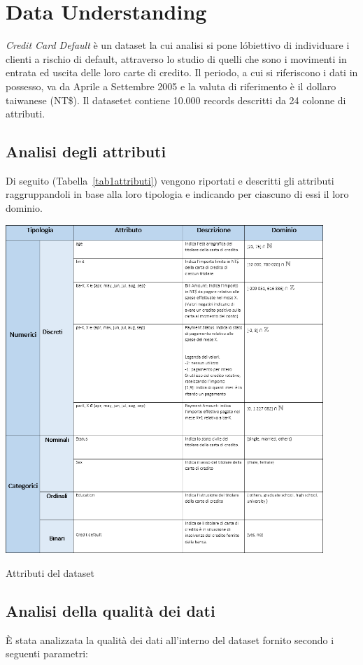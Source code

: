 \chapter{Data Understanding}

\textit{Credit Card Default} \`e un dataset la cui analisi si pone l\' obiettivo
di individuare i clienti a rischio di default, attraverso lo studio di quelli che sono i
movimenti in entrata ed uscita delle loro carte di credito.
Il periodo, a cui si riferiscono i dati in possesso, va da Aprile
a Settembre 2005 e la valuta di riferimento \`e il dollaro
taiwanese (NT\$). Il datasetet contiene 10.000 records descritti
da 24 colonne di attributi.

\section{Analisi degli attributi}

Di seguito (Tabella~\ref{tab1attributi}) vengono riportati
e descritti gli attributi raggruppandoli in base alla loro
tipologia e indicando per ciascuno di essi il loro dominio.

\begin{table}[H]
	\centering
	\includegraphics[width=12cm]{img/tabella1-attributi.png}
	\caption[LOF entry]{Attributi del dataset}
	\label{tab1attributi}
\end{table} 

\section{Analisi della qualit\`a dei dati}
\`E stata analizzata la qualit\`a dei dati all'interno del 
dataset fornito secondo i seguenti parametri:

